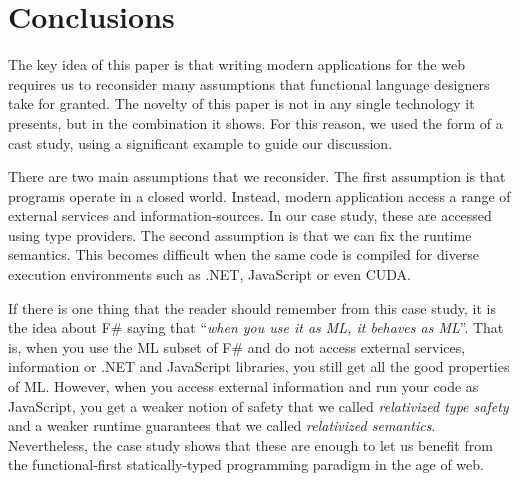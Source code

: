 \documentclass[submission,copyright,creativecommons]{eptcs}
\begin{document}

\section{Conclusions}

The key idea of this paper is that writing modern applications for the web requires us to 
reconsider many assumptions that functional language designers take for granted. The novelty
of this paper is not in any single technology it presents, but in the combination it shows.
For this reason, we used the form of a cast study, using a significant example to guide our
discussion.

\newpage
There are two main assumptions that we reconsider. The first assumption is that programs 
operate in a closed world. Instead, modern application access a range of external services
and information-sources. In our case study, these are accessed using type providers.
The second assumption is that we can fix the runtime semantics. This becomes difficult when
the same code is compiled for diverse execution environments such as .NET, JavaScript or
even CUDA.

If there is one thing that the reader should remember from this case study, it is the 
idea about F\# saying that ``\emph{when you use it as ML, it behaves as ML}''. That is, when
you use the ML subset of F\# and do not access external services, information or .NET and
JavaScript libraries, you still get all the good properties of ML. However, when you access
external information and run your code as JavaScript, you get a weaker notion of safety that
we called \emph{relativized type safety} and a weaker runtime guarantees that we called
\emph{relativized semantics}. Nevertheless, the case study shows that these are enough to
let us benefit from the functional-first statically-typed programming paradigm in the age of web.


\nocite{*}


\end{document}

